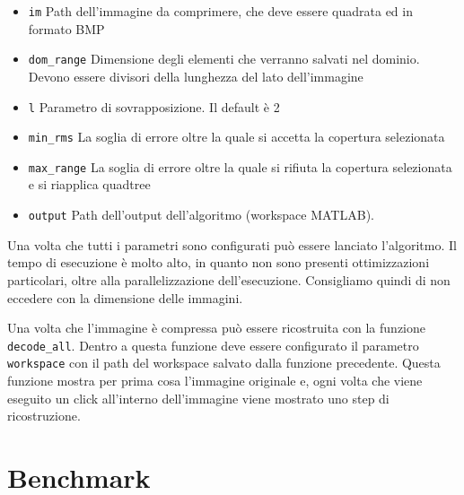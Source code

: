 \documentclass[11pt,a4paper,appendixprefix=true,numbers=noenddot]{scrreprt}
\begin{document}
\begin{itemize}
\item \texttt{im} Path dell'immagine da comprimere, che deve essere quadrata ed in formato BMP
\item \texttt{dom\_range} Dimensione degli elementi che verranno salvati nel dominio. Devono essere divisori della lunghezza del lato dell'immagine
\item \texttt{l} Parametro di sovrapposizione. Il default è 2
\item \texttt{min\_rms} La soglia di errore oltre la quale si accetta la copertura selezionata
\item \texttt{max\_range} La soglia di errore oltre la quale si rifiuta la copertura selezionata e si riapplica quadtree 
\item \texttt{output} Path dell'output dell'algoritmo (workspace MATLAB).
\end{itemize}

Una volta che tutti i parametri sono configurati può essere lanciato l'algoritmo. Il tempo di esecuzione è molto alto, in quanto non sono presenti ottimizzazioni particolari, oltre alla parallelizzazione dell'esecuzione. Consigliamo quindi di non eccedere con la dimensione delle immagini.

Una volta che l'immagine è compressa può essere ricostruita con la funzione \texttt{decode\_all}. Dentro a questa funzione deve essere configurato il parametro \texttt{workspace} con il path del workspace salvato dalla funzione precedente. Questa funzione mostra per prima cosa l'immagine originale e, ogni volta che viene eseguito un click all'interno dell'immagine viene mostrato uno step di ricostruzione.

\section{Benchmark}



 
\end{document}
